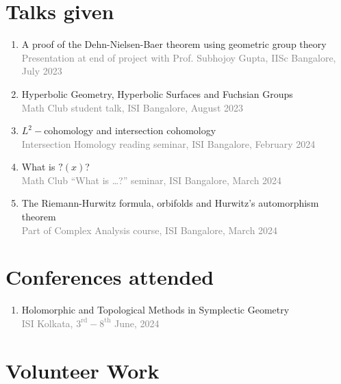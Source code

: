 \documentclass[a4paper, oneside, final]{scrartcl} %
\begin{document}
\section{Talks given}

\begin{enumerate}[label = $\bullet$]
  \item A proof of the Dehn-Nielsen-Baer theorem using geometric group theory \\
        \textcolor{grey}{Presentation at end of project with Prof. Subhojoy Gupta, IISc Bangalore, July 2023}
  \item Hyperbolic Geometry, Hyperbolic Surfaces and Fuchsian Groups \\
        \textcolor{grey}{Math Club student talk, ISI Bangalore, August 2023}
  \item \( L^2- \)cohomology and intersection cohomology \\
        \textcolor{grey}{Intersection Homology reading seminar, ISI Bangalore, February 2024}
  \item What is \( ?(x) \)? \\
        \textcolor{grey}{Math Club ``What is \dots ?'' seminar, ISI Bangalore, March 2024}

  \item The Riemann-Hurwitz formula, orbifolds and Hurwitz's automorphism theorem\\
        \textcolor{grey}{Part of Complex Analysis course, ISI Bangalore, March 2024}
\end{enumerate}

\section{Conferences attended}

\begin{enumerate}[label = $\bullet$]
  \item Holomorphic and Topological Methods in Symplectic Geometry \\
        \textcolor{grey}{ISI Kolkata, \( {3}^{\text{rd}} -  {8}^{\text{th}} \) June, 2024}
\end{enumerate}

\section{Volunteer Work}
\end{document}

